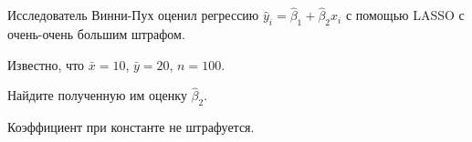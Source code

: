 
\begin{question}
Исследователь Винни-Пух оценил регрессию \(\hat y_i = \hat\beta_1 + \hat\beta_2 x_i\)
с помощью LASSO с очень-очень большим штрафом.

Известно, что \(\bar x = 10\), \(\bar y = 20\), \(n = 100\).

Найдите полученную им оценку \(\hat\beta_2\).
\end{question}

\begin{solution}
Коэффициент при константе не штрафуется.
\end{solution}

